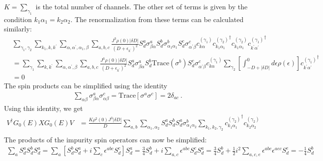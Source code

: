 \(K = \sum_{\gamma_1}\) is the total number of channels. The other set of terms is given by the condition \(k_1\alpha_1 = k_2\alpha_2\). The renormalization from these terms can be calculated similarly:
\begin{equation}\begin{aligned}
	&\sum_{\gamma_1,\gamma_2}\sum_{k_1,k,k^\prime}\sum_{\alpha,\alpha^\prime,\alpha_1,\beta} \sum_{a,b,c}\frac{J^3 \rho(0) |\delta D|}{\left(D + \epsilon_{k^\prime}\right)^2} S_d^a\sigma^a_{\beta \alpha}S_d^b\sigma^b_{\alpha_1 \alpha_1}S_d^c \sigma^c_{\alpha^\prime \beta} c^{(\gamma_1)}_{k\alpha}{c^{(\gamma_2)}_{k_1 \alpha_1}}^\dagger c^{(\gamma_2)}_{k_1 \alpha_1} {c^{(\gamma_1)}_{k^\prime\alpha^\prime}}^\dagger\\
	&=\sum_{\gamma_1}\sum_{k,k^\prime}\sum_{\alpha,\alpha^\prime,\beta} \sum_{a,b,c}\frac{J^3 \rho(0) |\delta D|}{\left(D + \epsilon_{k^\prime}\right)^2} S_d^a\sigma^a_{\beta \alpha}S_d^b \mathrm{Trace}\left(\sigma^b\right)S_d^c \sigma^c_{\alpha^\prime \beta} c^{(\gamma_1)}_{k\alpha} \sum_{\gamma_2}\left[\int_{-D + |\delta D|}^0 d\epsilon \rho(\epsilon)\right] {c^{(\gamma_1)}_{k^\prime\alpha^\prime}}^\dagger\\
	&=0
\end{aligned}\end{equation}
The spin products can be simplified using the identity 
\begin{equation}\begin{aligned}
	\sum_{\alpha\beta}\sigma^a_{\beta \alpha} \sigma^c_{\alpha \beta} = \text{Trace}\left[\sigma^a \sigma^c\right] = 2\delta_{ac}~.
\end{aligned}\end{equation}
Using this identity, we get
\begin{equation}\begin{aligned}
	V^\dagger G_0(E)XG_0(E)V &=\frac{K \rho^2(0) J^3 |\delta D|}{D} \sum_{a,b}\sum_{\alpha_1,\alpha_2}S_d^a S_d^b S_d^a \sigma^b_{\alpha_1 \alpha_2} \sum_{k_1,k_2,\gamma_2}{c^{(\gamma_2)}_{k_1 \alpha_1}}^\dagger c^{(\gamma_2)}_{k_2 \alpha_2}\\
\end{aligned}\end{equation}
The products of the impurity spin operators can now be simplified:
\begin{equation}\begin{aligned}
	\sum_a S_d^a S_d^b S_d^a = \sum_a \left[S_d^b S_d^a + i\sum_c \epsilon^{abc}S_d^c\right] S_d^a = \frac{3}{4}S_d^b + i\sum_{a,c}  \epsilon^{abc}S_d^c S_d^a = \frac{3}{4}S_d^b + \frac{1}{2}i^2\sum_{a,c,e}  \epsilon^{abc}  \epsilon^{aec}S_d^e = -\frac{1}{4}S_d^b
\end{aligned}\end{equation}
